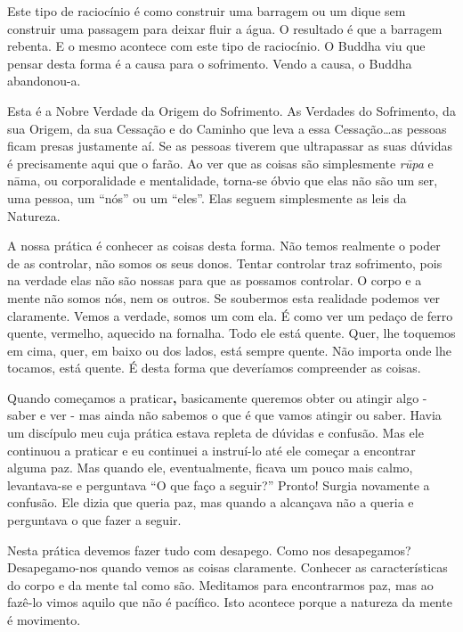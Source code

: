 Este tipo de raciocínio é como construir uma barragem ou um dique sem
construir uma passagem para deixar fluir a água. O resultado é que a
barragem rebenta. E o mesmo acontece com este tipo de raciocínio. O
Buddha viu que pensar desta forma é a causa para o sofrimento. Vendo a
causa, o Buddha abandonou-a.

Esta é a Nobre Verdade da Origem do Sofrimento. As Verdades do
Sofrimento, da sua Origem, da sua Cessação e do Caminho que leva a essa
Cessação\ldots{}as pessoas ficam presas justamente aí. Se as pessoas
tiverem que ultrapassar as suas dúvidas é precisamente aqui que o farão.
Ao ver que as coisas são simplesmente \emph{rūpa} e nāma, ou
corporalidade e mentalidade, torna-se óbvio que elas não são um ser, uma
pessoa, um ``nós'' ou um ``eles''. Elas seguem simplesmente as leis da
Natureza.

A nossa prática é conhecer as coisas desta forma. Não temos realmente o
poder de as controlar, não somos os seus donos. Tentar controlar traz
sofrimento, pois na verdade elas não são nossas para que as possamos
controlar. O corpo e a mente não somos nós, nem os outros. Se soubermos
esta realidade podemos ver claramente. Vemos a verdade, somos um com
ela. É como ver um pedaço de ferro quente, vermelho, aquecido na
fornalha. Todo ele está quente. Quer, lhe toquemos em cima, quer, em
baixo ou dos lados, está sempre quente. Não importa onde lhe tocamos,
está quente. É desta forma que deveríamos compreender as coisas.

Quando começamos a praticar\textbf{,} basicamente queremos obter ou
atingir algo - saber e ver - mas ainda não sabemos o que é que vamos
atingir ou saber. Havia um discípulo meu cuja prática estava repleta de
dúvidas e confusão. Mas ele continuou a praticar e eu continuei a
instruí-lo até ele começar a encontrar alguma paz. Mas quando ele,
eventualmente, ficava um pouco mais calmo, levantava-se e perguntava ``O
que faço a seguir?'' Pronto! Surgia novamente a confusão. Ele dizia que
queria paz, mas quando a alcançava não a queria e perguntava o que fazer
a seguir.

Nesta prática devemos fazer tudo com desapego. Como nos desapegamos?
Desapegamo-nos quando vemos as coisas claramente. Conhecer as
características do corpo e da mente tal como são. Meditamos para
encontrarmos paz, mas ao fazê-lo vimos aquilo que não é pacífico. Isto
acontece porque a natureza da mente é movimento.

